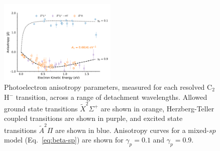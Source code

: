 \documentclass[journal=jpcafh,manuscript=article,layout=onecolumn, 12pt]{achemso}
\begin{document}


\begin{figure}[th!]
	\includegraphics[width=0.5\textwidth]{figures/PAD.pdf}
	\caption{Photoelectron anisotropy parameters, measured for each resolved C$_2$H$^-$ transition, across a range of detachment wavelengths. Allowed ground state transitions $\tilde{X}^2\Sigma^+$ are shown in orange, Herzberg-Teller coupled transitions are shown in purple, and excited state transitions $\tilde{A} ^2\Pi$ are shown in blue. Anisotropy curves for a mixed-$sp$ model (Eq.~\ref{eq:beta-sp}) are shown for $\gamma_p=0.1$ and $\gamma_p=0.9$.}
	\label{fig:5}
\end{figure}
\end{document}
